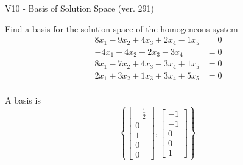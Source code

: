\begin{exercise}
  \begin{exerciseTitle}V10 - Basis of Solution Space (ver. 291)\end{exerciseTitle}
  \begin{exerciseStatement}
    Find a basis for the solution space of the homogeneous system 
\begin{align*}
 8 x_ 1 -9 x_ 2 + 4 x_ 3 + 2 x_ 4 -1 x_ 5 &= 0  \\ 
  -4 x_ 1 + 4 x_ 2 -2 x_ 3 -3 x_ 4 &= 0  \\ 
  8 x_ 1 -7 x_ 2 + 4 x_ 3 -3 x_ 4 + 1 x_ 5 &= 0  \\ 
  2 x_ 1 + 3 x_ 2 + 1 x_ 3 + 3 x_ 4 + 5 x_ 5 &= 0  \\ 
 \end{align*}


 
  \end{exerciseStatement}

  \begin{exerciseAnswer}
   A basis is   
\[\left\{\left[\begin{array}{c}
-\frac{1}{2} \\
0 \\
1 \\
0 \\
0
\end{array}\right] , \left[\begin{array}{c}
-1 \\
-1 \\
0 \\
0 \\
1
\end{array}\right]\right\}.\]

  


  \end{exerciseAnswer}
\end{exercise}